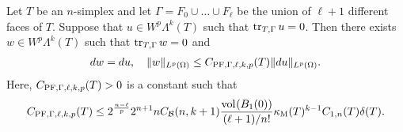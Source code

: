 \documentclass[10pt,a4paper]{article}
\begin{document}
\begin{lemma}\label{lemma:mixedbconsimplex:exteriorderivative}
    Let $T$ be an $n$-simplex 
    and let $\Gamma = F_{0} \cup \dots \cup F_{\ell}$ be the union of $\ell+1$ different faces of $T$. 
    Suppose that $u \in W^{p}\Lambda^{k}(T)$ such that 
    $\operatorname{tr}_{T,\Gamma} u = 0$.
    Then there exists $w \in W^{p}\Lambda^{k}(T)$ such that 
    $\operatorname{tr}_{T,\Gamma} w = 0$
    and  
    \begin{align*}
        d w = d u,
        \quad 
        \| w \|_{L^{p}(\Omega)} 
        \leq 
        C_{{\rm PF},\Gamma,\ell,k,p}(T)
        \| d u \|_{L^{p}(\Omega)}
        .
    \end{align*}
    Here, $C_{{\rm PF},\Gamma,\ell,k,p}(T) > 0$ is a constant such that 
    \begin{align*}
        C_{{\rm PF},\Gamma,\ell,k,p}(T)
        \leq 
        2^{\frac{n-\ell}{p}}
        2^{n+1} n C_{{\mathcal B}}(n,k+1) \frac{ \operatorname{vol}_{}(B_1(0)) }{ (\ell+1)/n! } 
        \kappa_{\rm M}(T)^{k-1}
        C_{1,n}(T) 
        {\delta}(T)
        .
    \end{align*}
\end{lemma}
\end{document}
